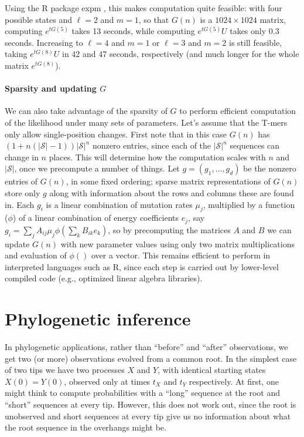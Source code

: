 \documentclass{article}
\newcommand{\calS}{\mathcal{S}}  %
\theoremstyle{plain}
\theoremstyle{definition}
\begin{document}
Using the R package expm \citep{R_expm}, this makes computation quite feasible:
with four possible states and $\ell=2$ and $m=1$, so that $G(n)$ is a $1024 \times 1024$ matrix,
computing $e^{t G(5) }$ takes 13 seconds, while computing $e^{t G(5)} U$ takes only 0.3 seconds.
Increasing to $\ell=4$ and $m=1$ or $\ell=3$ and $m=2$ is still feasible, taking $e^{t G(8)} U$ in 42 and 47 seconds, respectively
(and much longer for the whole matrix $e^{t G(8)}$).



\paragraph{Sparsity and updating $G$}
We can also take advantage of the sparsity of $G$ to perform efficient computation of the likelihood
under many sets of parameters.
Let's assume that the T-mers only allow single-position changes.
First note that in this case $G(n)$ has
$(1+n(|\calS|-1)) |\calS|^{n}$ nonzero entries,
since each of the $|\calS|^{n}$ sequences can change in $n$ places.
This will determine how the computation scales with $n$ and $|\calS|$,
once we precompute a number of things.
Let $g = (g_1, \ldots, g_d)$ be the nonzero entries of $G(n)$, in some fixed ordering;
sparse matrix representations of $G(n)$ store only $g$ along with information about the rows and columns these are found in.
Each $g_i$ is a linear combination of mutation rates $\mu_j$,
multiplied by a function ($\phi$) of a linear combination of energy coefficients $e_j$,
say $g_i = \sum_j A_{ij} \mu_j \phi(\sum_k B_{ik} e_k)$,
so by precomputing the matrices $A$ and $B$ we can update $G(n)$ with new parameter values
using only two matrix multiplications and evaluation of $\phi()$ over a vector.
This remains efficient to perform in interpreted languages such as R,
since each step is carried out by lower-level compiled code (e.g., optimized linear algebra libraries).

\section{Phylogenetic inference}

In phylogenetic applications, rather than ``before'' and ``after'' observations,
we get two (or more) observations evolved from a common root.
In the simplest case of two tips we have two processes $X$ and $Y$,
with identical starting states $X(0)=Y(0)$,
observed only at times $t_X$ and $t_Y$ respectively.
At first, one might think to compute probabilities
with a ``long'' sequence at the root and ``short'' sequences at every tip.
However, this does not work out, since the root is unobserved
and short sequences at every tip give us no information about what the root sequence
in the overhangs might be.
\end{document}
